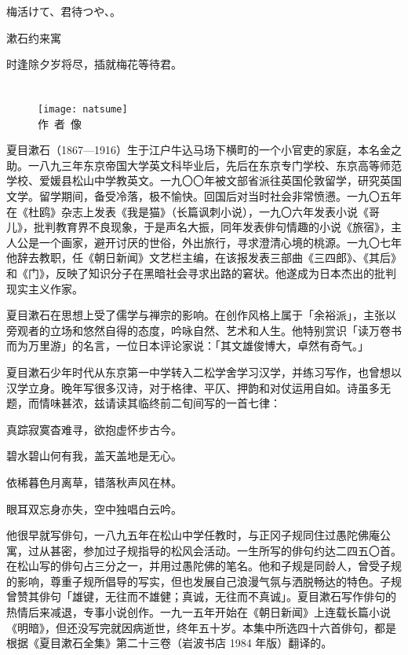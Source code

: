 \begin{haiku}
    {\FH 梅活けて、君待つや、。}

    {\FK 漱石约来寓}

    {\FK 时逢除夕岁将尽，插就梅花等待君。}
\end{haiku}

\chapter[{\FM 夏目漱石}]{\FM {}}

\begin{center}
    \begin{figure}
        \centering
        \texttt{[image: natsume]}\\[1em]
        \large{\FS 作~者~像}
    \end{figure}
\end{center}

\newpage

{\FS
    夏目漱石（1867—1916）生于江户牛込马场下横町的一个小官吏的家庭，本名金之助。一八九三年东京帝国大学英文科毕业后，先后在东京专门学校、东京高等师范学校、爱媛县松山中学教英文。一九〇〇年被文部省派往英国伦敦留学，研究英国文学。留学期间，备受冷落，极不愉快。回国后对当时社会非常愤懑。一九〇五年在《杜鸥》杂志上发表《我是猫》（长篇讽刺小说），一九〇六年发表小说《哥儿》，批判教育界不良现象，于是声名大振，同年发表俳句情趣的小说《旅宿》，主人公是一个画家，避开讨厌的世俗，外出旅行，寻求澄清心境的桃源。一九〇七年他辞去教职，任《朝日新闻》文艺栏主编，在该报发表三部曲《三四郎》、《其后》和《门》，反映了知识分子在黑暗社会寻求出路的窘状。他遂成为日本杰出的批判现实主义作家。

    夏目漱石在思想上受了儒学与禅宗的影响。在创作风格上属于「余裕派」，主张以旁观者的立场和悠然自得的态度，吟咏自然、艺术和人生。他特别赏识「读万卷书而为万里游」的名言，一位日本评论家说：「其文雄俊博大，卓然有奇气。」

    夏目漱石少年时代从东京第一中学转入二松学舍学习汉学，并练习写作，也曾想以汉学立身。晚年写很多汉诗，对于格律、平仄、押韵和对仗运用自如。诗虽多无题，而情味甚浓，兹请读其临终前二旬间写的一首七律：
    \begin{center}
        真踪寂寞杳难寻，欲抱虚怀步古今。

        碧水碧山何有我，盖天盖地是无心。

        依稀暮色月离草，错落秋声风在林。

        眼耳双忘身亦失，空中独唱白云吟。
    \end{center}

    他很早就写俳句，一八九五年在松山中学任教时，与正冈子规同住过愚陀佛庵公寓，过从甚密，参加过子规指导的松风会活动。一生所写的俳句约达二四五〇首。在松山写的俳句占三分之一，并用过愚陀佛的笔名。他和子规是同龄人，曾受子规的影响，尊重子规所倡导的写实，但也发展自己浪漫气氛与洒脱畅达的特色。子规曾赞其俳句「雄键，无往而不雄健；真诚，无往而不真诚」。夏目漱石写作俳句的热情后来减退，专事小说创作。一九一五年开始在《朝日新闻》上连载长篇小说《明暗》，但还没写完就因病逝世，终年五十岁。本集中所选四十六首俳句，都是根据《夏目漱石全集》第二十三卷（岩波书店 1984 年版）翻译的。
}

